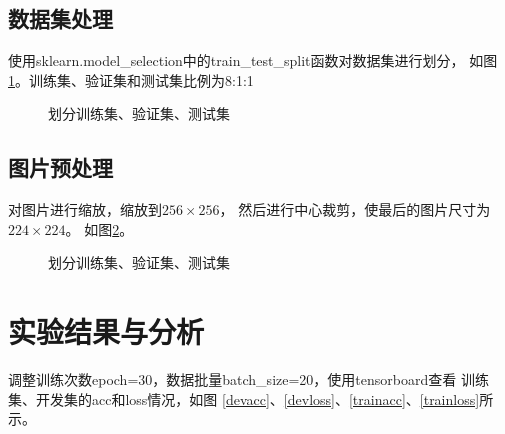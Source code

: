 \documentclass{article}
\begin{document}
\subsection{数据集处理}

使用sklearn.model\_selection中的train\_test\_split函数对数据集进行划分，
如图\ref{split}。训练集、验证集和测试集比例为8:1:1

\begin{figure}[H]
    \centering
    \begin{minipage}{\textwidth}
        \centering
        \lstset{numbers=left,xleftmargin=2em,breaklines,language=Python, aboveskip=0pt,belowskip=0pt}
        
        
    \end{minipage}
    \caption{划分训练集、验证集、测试集}
    \label{split}
\end{figure}

\subsection{图片预处理}

对图片进行缩放，缩放到$256 \times 256$，
然后进行中心裁剪，使最后的图片尺寸为$224 \times 224$。
如图\ref{resize}。

\begin{figure}[H]
    \centering
    \begin{minipage}{\textwidth}
        \centering
        \lstset{numbers=left,xleftmargin=2em,breaklines,language=Python, aboveskip=0pt,belowskip=0pt}
        
        
        
    \end{minipage}
    \caption{划分训练集、验证集、测试集}
    \label{resize}
\end{figure}

\section{实验结果与分析}

调整训练次数epoch=30，数据批量batch\_size=20，使用tensorboard查看
训练集、开发集的acc和loss情况，如图
\ref{devacc}、\ref{devloss}、\ref{trainacc}、\ref{trainloss}所示。
\end{document}
